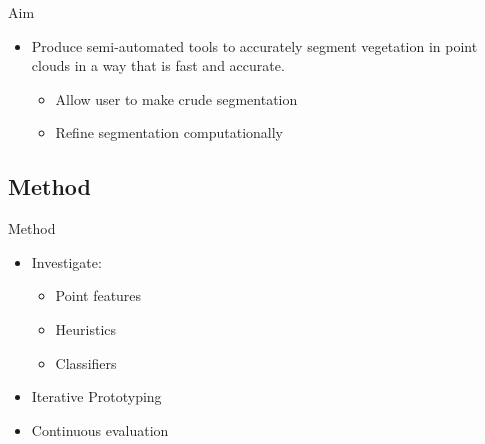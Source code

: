 \documentclass[compress]{beamer}
\begin{document}
\begin{frame}{Aim}
\begin{itemize}

\item
Produce semi-automated tools to accurately segment vegetation in point clouds in a way that is fast and accurate.

\begin{itemize}
\item Allow user to make crude segmentation
\item Refine segmentation computationally
\end{itemize}

\end{itemize}


\end{frame}

%
%

\subsection{Method}

\begin{frame}{Method}

\begin{itemize}
\item Investigate:
\begin{itemize}
  \item Point features
  \item Heuristics
  \item Classifiers
\end{itemize}
\item Iterative Prototyping
\item Continuous evaluation
\end{itemize}

\end{frame}
\end{document}
